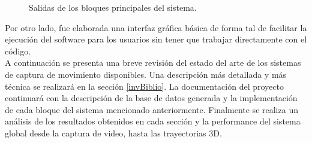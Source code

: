 \begin{figure}[H]
  \caption{Salidas de los bloques principales del sistema.}
      \label{ejemplotutiintro}
\end{figure}

Por otro lado, fue elaborada una interfaz gráfica básica de forma tal de facilitar la ejecución del software para los usuarios sin tener que trabajar directamente con el código.
\\ 

A continuación se presenta una breve revisión del estado del arte de los sistemas de captura de movimiento disponibles. Una descripción más detallada y más técnica se realizará en la sección \ref{invBiblio}. La documentación del proyecto continuará con la descripción de la base de datos generada y la implementación de cada bloque del sistema mencionado anteriormente. Finalmente se realiza un análisis de los resultados obtenidos en cada sección y la performance del sistema global desde la captura de video, hasta las trayectorias 3D.

